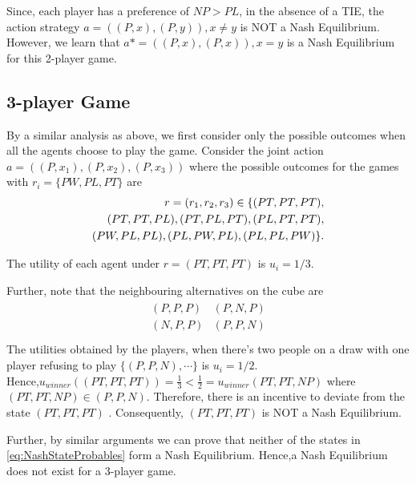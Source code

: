 \documentclass[11pt]{article}
\theoremstyle{definition}
\begin{document}
Since, each player has a preference of $NP > PL$, in the absence of a TIE, the action strategy $a = ((P,x),(P,y)), x\neq y$ is NOT a Nash Equilibrium. 
However, we learn that $a* = ((P,x),(P,x)), x=y$ is a Nash Equilibrium for this 2-player game. 

\subsection{3-player Game}

By a similar analysis as above, we first consider only the possible outcomes when all the agents choose to play the game. Consider the joint action $a = ((P,x_1),(P,x_2),(P,x_3))$ where the possible outcomes for the games with
$r_i =\{PW,PL,PT\}$  are 
\begin{align}
r = (r_1,r_2,r_3) \in \{ (PT,PT,PT),\notag \\
(PT,PT,PL),(PT,PL,PT),(PL,PT,PT),\notag \\
(PW,PL,PL), (PL,PW,PL), (PL,PL,PW)\}. \label{eq:NashStateProbables}
\end{align}


The utility of each agent under $r = (PT,PT,PT)$ is $u_i = 1/3$.

Further, note that the neighbouring alternatives on the cube are
\begin{align*}
\begin{array}{cc}
(P,P,P)&(P,N,P)\\
(N,P,P)&(P,P,N)\\
\end{array}
\end{align*}
The utilities obtained by the players, when there's two people on a draw with one player refusing to play $\{(P,P,N),\cdots \}$ is $u_i = 1/2$.\\
Hence,$u_{winner}((PT,PT,PT))= \frac{1}{3} < \frac{1}{2}= u_{winner}(PT,PT,NP)$ where $(PT,PT,NP) \in (P,P,N)$. Therefore, there is an incentive to deviate from the state $(PT,PT,PT)$ . Consequently, $(PT,PT,PT)$ is NOT a Nash Equilibrium.

Further, by similar arguments we can prove that neither of the states in \eqref{eq:NashStateProbables} form a Nash Equilibrium. Hence,a Nash Equilibrium does not exist for a 3-player game. 
\end{document}
